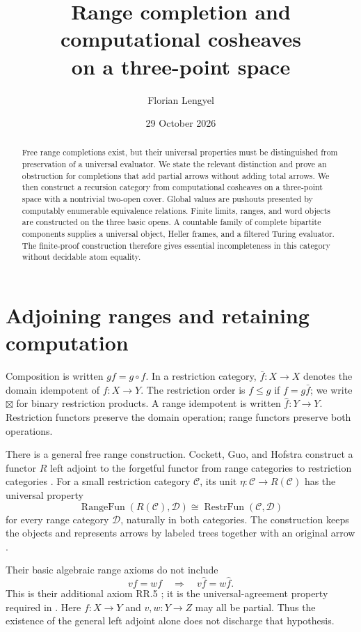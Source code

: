 \documentclass[11pt]{article}
\title{Range completion and computational cosheaves\\on a three-point space}
\author{Florian Lengyel}
\date{29 October 2026}
\newcommand{\C}{\mathscr C}
\begin{document}
\maketitle
\begin{abstract}
Free range completions exist, but their universal properties must be
distinguished from preservation of a universal evaluator. We state the
relevant distinction and prove an obstruction for completions that add
partial arrows without adding total arrows.
We then construct a recursion category from computational cosheaves on
a three-point space with a nontrivial two-open cover. Global values are
pushouts presented by computably enumerable equivalence relations.
Finite limits, ranges, and word objects are constructed on the three
basic opens. A countable family of complete bipartite components supplies
a universal object, Heller frames, and a filtered Turing evaluator.
The finite-proof construction therefore gives essential incompleteness
in this category without decidable atom equality.
\end{abstract}

\section{Adjoining ranges and retaining computation}

Composition is written $gf=g\circ f$. In a restriction category,
$\bar f:X\to X$ denotes the domain idempotent of $f:X\to Y$.
The restriction order is $f\leq g$ if $f=g\bar f$;
we write $\boxtimes$ for binary restriction products.
A range idempotent is written $\widehat f:Y\to Y$.
Restriction functors preserve the domain operation; range functors
preserve both operations.

There is a general free range construction. Cockett, Guo, and Hofstra
construct a functor $R$ left adjoint to the forgetful functor from
range categories to restriction categories
\cite[Theorem~5.12]{CGH1}. For a small restriction category $\C$,
its unit $\eta:\C\to R(\C)$ has the universal property
\[
 \operatorname{RangeFun}(R(\C),\mathscr D)
 \cong \operatorname{RestrFun}(\C,\mathscr D)
\]
for every range category $\mathscr D$, naturally in both categories.
The construction keeps the objects and represents arrows by labeled
trees together with an original arrow \cite[\S5]{CGH1}.

Their basic algebraic range axioms do not include
\begin{equation}\label{eq:agreement}
 vf=wf\quad\Longrightarrow\quad
 v\widehat f=w\widehat f.
\end{equation}
This is their additional axiom RR.5 \cite[\S4.11]{CGH1};
it is the universal-agreement property required in \cite{Iteration}.
Here $f:X\to Y$ and $v,w:Y\to Z$ may all be partial.
Thus the existence of the general left adjoint alone does not discharge
that hypothesis.
\end{document}

